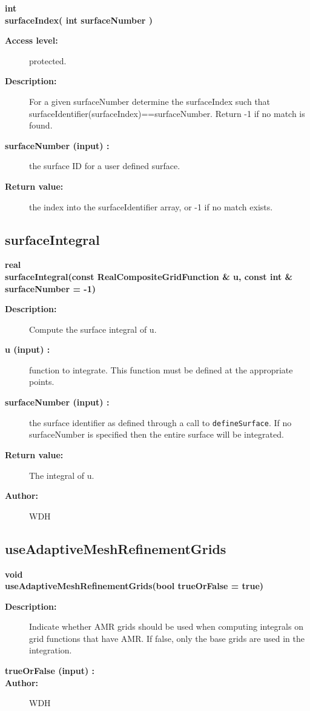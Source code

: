 \begin{flushleft} \textbf{%
int  \\ 
\settowidth{\IntegrateIncludeArgIndent}{surfaceIndex(}%
surfaceIndex( int surfaceNumber )
}\end{flushleft}
\begin{description}
\item[{\bf Access level:}]  protected.
\item[{\bf Description:}] 
   For a given surfaceNumber determine the surfaceIndex such that
   surfaceIdentifier(surfaceIndex)==surfaceNumber. Return -1 if no match is found.
\item[{\bf surfaceNumber (input) :}]  the surface ID for a user defined surface.
\item[{\bf Return value:}]  the index into the surfaceIdentifier array, or -1 if no match exists.
\end{description}
\subsection{surfaceIntegral}
 
\begin{flushleft} \textbf{%
real  \\ 
\settowidth{\IntegrateIncludeArgIndent}{surfaceIntegral(}%
surfaceIntegral(const RealCompositeGridFunction \& u, const int \& surfaceNumber  = -1)
}\end{flushleft}
\begin{description}
\item[{\bf Description:}] 
    Compute the surface integral of u. 
\item[{\bf u (input) :}]  function to integrate. This function must be defined at the appropriate points.
\item[{\bf surfaceNumber (input) :}]  the surface identifier as defined through a call to {\tt defineSurface}.
    If no   surfaceNumber is specified then the entire surface will be integrated.
\item[{\bf Return value:}]  The integral of u.
\item[{\bf Author:}]  WDH
\end{description}
\subsection{useAdaptiveMeshRefinementGrids}
 
\begin{flushleft} \textbf{%
void  \\ 
\settowidth{\IntegrateIncludeArgIndent}{useAdaptiveMeshRefinementGrids(}%
useAdaptiveMeshRefinementGrids(bool trueOrFalse  = true)
}\end{flushleft}
\begin{description}
\item[{\bf Description:}] 
   Indicate whether AMR grids should be used 
   when computing integrals on grid functions that have AMR. If false, only the base grids
   are used in the integration.
\item[{\bf trueOrFalse (input) :}]  
\item[{\bf Author:}]  WDH
\end{description}
